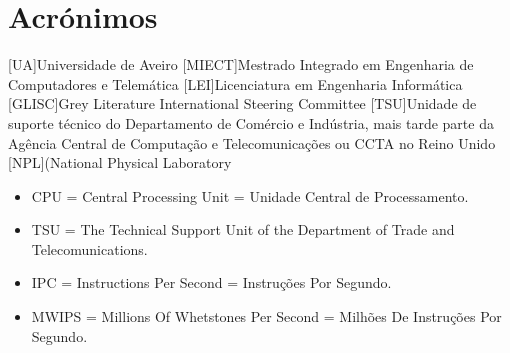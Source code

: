 \documentclass{report}
\begin{document}
\chapter*{Acrónimos}
\begin{acronym}
[UA]{Universidade de Aveiro}
[MIECT]{Mestrado Integrado em Engenharia de Computadores e Telemática}
[LEI]{Licenciatura em Engenharia Informática}
[GLISC]{Grey Literature International Steering Committee}
[TSU]{Unidade de suporte técnico do Departamento de Comércio e Indústria, mais tarde parte da Agência Central de Computação e Telecomunicações ou CCTA no Reino Unido}
[NPL]{(National Physical Laboratory}
\end{acronym}
\begin{itemize}

\item CPU = Central Processing Unit = Unidade Central de Processamento.
\item TSU = The Technical Support Unit of the Department of Trade and Telecomunications.
\item IPC = Instructions Per Second = Instruções Por Segundo.
\item MWIPS = Millions Of Whetstones Per Second = Milhões De Instruções Por Segundo.



\end{itemize}


\end{document}
